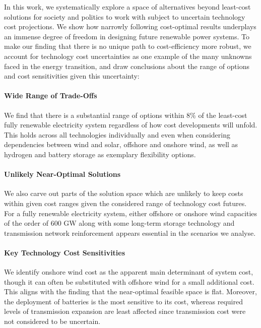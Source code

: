In this work, we systematically explore a space of alternatives beyond
least-cost solutions for society and politics to work with subject to uncertain
technology cost projections. We show how narrowly following cost-optimal results
underplays an immense degree of freedom in designing future renewable power
systems. To make our finding that there is no unique path to cost-efficiency
more robust, we account for technology cost uncertainties as one example of the
many unknowns faced in the energy transition, and draw conclusions about the
range of options and cost sensitivities given this uncertainty:

\paragraph{Wide Range of Trade-Offs}
We find that there is a substantial range of options within 8\% of the
least-cost fully renewable electricity system regardless of how cost
developments will unfold. This holds across all technologies individually and
even when considering dependencies between wind and solar, offshore and onshore
wind, as well as hydrogen and battery storage as exemplary flexibility options.

\paragraph{Unlikely Near-Optimal Solutions}
We also carve out parts of the solution space which are unlikely to keep costs
within given cost ranges given the considered range of technology cost futures.
For a fully renewable electricity system, either offshore or onshore wind
capacities of the order of 600 GW along with some long-term storage technology
and transmission network reinforcement appears essential in the scenarios we
analyse.


\paragraph{Key Technology Cost Sensitivities}
We identify onshore wind cost as the apparent main determinant of system cost,
though it can often be substituted with offshore wind for a small additional
cost. This aligns with the finding that the near-optimal feasible space is flat.
Moreover, the deployment of batteries is the most sensitive to its cost, whereas
required levels of transmission expansion are least affected since transmission
cost were not considered to be uncertain. \\

